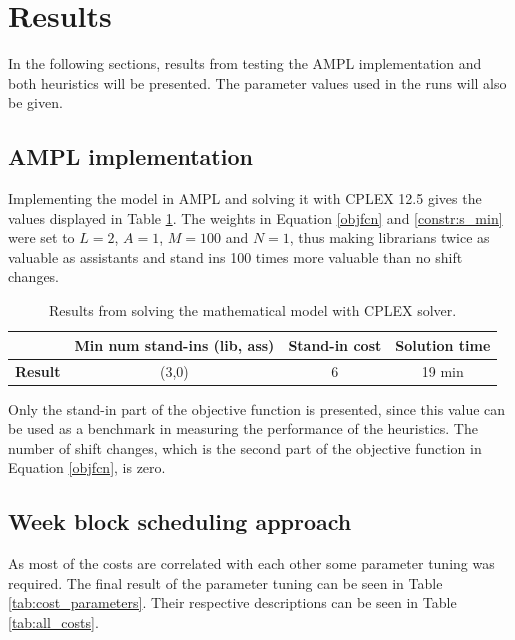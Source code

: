 \section{Results} \label{section:results}
In the following sections, results from testing the AMPL implementation and both heuristics will be presented. The parameter values used in the runs will also be given. 

\subsection{AMPL implementation}\label{sec:ampl_res}

Implementing the model in AMPL and solving it with CPLEX 12.5 gives the values displayed in Table \ref{tab:CPLEX_res}. The weights in Equation \ref{objfcn} and \ref{constr:s_min} were set to $L = 2$, $A = 1$, $M =100$ and $N=1$, thus making librarians twice as valuable as assistants and stand ins 100 times more valuable than no shift changes. 

\begin{table}[!h]
\centering
\caption{Results from solving the mathematical model with CPLEX solver.}
\label{tab:CPLEX_res}
\begin{tabular}{|l|p{3cm}|p{3cm}|l|}
\hline
\rowcolor{Gray} & \textbf{Min num stand-ins (lib, ass)} & \textbf{Stand-in cost} & \textbf{Solution time} \\ \hline
\cellcolor{Gray} \textbf{Result} & \multicolumn{1}{c|}{(3,0)} & \multicolumn{1}{c|}{6} & \multicolumn{1}{c|}{19 min} \\
\hline
\end{tabular}
\end{table}

Only the stand-in part of the objective function is presented, since this value can be used as a benchmark in measuring the performance of the heuristics. The number of shift changes, which is the second part of the objective function in Equation \ref{objfcn}, is zero.

\subsection{Week block scheduling approach}
As most of the costs are correlated with each other some parameter tuning was required. The final result of the parameter tuning can be seen in Table \ref{tab:cost_parameters}. Their respective descriptions can be seen in Table \ref{tab:all_costs}. 

